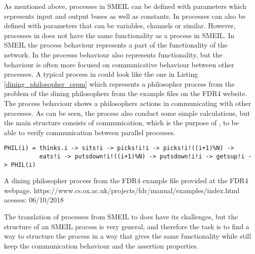 As mentioned above, processes in SMEIL can be defined with parameters which represents input and output buses as well as constants. In \cspm{} processes can also be defined with parameters that can be variables, channels or similar. However, processes in \cspm does not have the same functionality as a process in SMEIL. In SMEIL the process behaviour represents a part of the functionality of the network. In \cspm the processs behaviour also represents functionality, but the behaviour is often more focused on communicative behaviour between other processes. A typical process in \cspm could look like the one in Listing \ref{dining_philosopher_cspm} which represents a philosopher process from the problem of the dining philosophers from the example files on the FDR4 website. %
The process behaviour shows a philosophers actions in communicating with other processes. As can be seen, the process also conduct some simple calculations, but the main structure consists of communication, which is the purpose of \cspm, to be able to verify communication between parallel processes.
\begin{listing}
\begin{verbatim}
PHIL(i) = thinks.i -> sits!i -> picks!i!i -> picks!i!((i+1)%N) ->
          eats!i -> putsdown!i!((i+1)%N) -> putsdown!i!i -> getsup!i -> PHIL(i)

\end{verbatim}
\caption{A dining philosopher process from the FDR4 example file provided at the FDR4 webpage. https://www.cs.ox.ac.uk/projects/fdr/manual/examples/index.html acesses: 06/10/2018}
\label{dining_philosopher_cspm}
\end{listing}

The translation of processes from SMEIL to \cspm does have its challenges, but the structure of an SMEIL process is very general, and therefore the task is to find a way to structure the \cspm process in a way that gives the same functionality while still keep the \cspm communication behaviour and the assertion properties.


